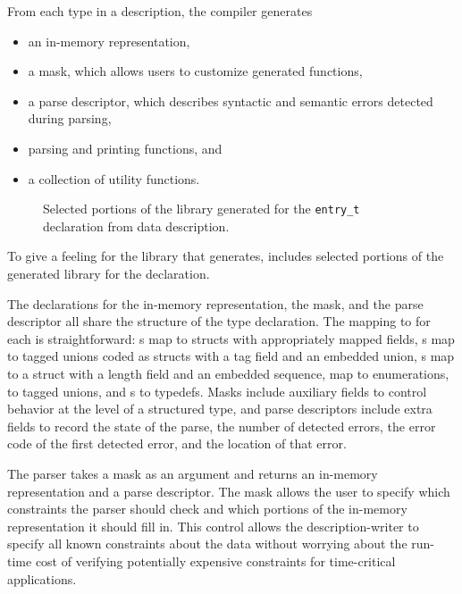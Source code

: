 From each type in a \pads{} description, the compiler generates 
\begin{itemize}
\setlength{\itemsep}{0ex plus0.2ex}
\item an in-memory representation, 
\item a mask, which allows users to customize generated functions,
\item a parse descriptor, which describes syntactic and
semantic errors detected during parsing, 
\item parsing and printing functions, and 
\item a collection of utility functions.
\end{itemize}
%
\setcounter{totalnumber}{1}
\setcounter{dbltopnumber}{1}
\renewcommand{\topfraction}{0.85}
\renewcommand{\textfraction}{0.1}
\renewcommand{\floatpagefraction}{0.75}
\begin{figure*}
\begin{tiny}

\caption{Selected portions of the library generated for the \texttt{entry\_t}
  declaration from \dibbler{} data description.}
\label{figure:library}
\end{tiny}
\end{figure*}
To give a feeling for the library that \pads{} generates, 
 includes selected portions of the generated 
library for the \dibbler{}  declaration.

The \C{} declarations for the in-memory representation, the mask, 
and the parse descriptor all share the structure of the \pads{}
type declaration.  The mapping to \C{} for each is straightforward: 
s map to \C{} structs with appropriately mapped fields, 
s map to tagged unions coded as \C{} structs with a tag field 
and an embedded 
union, s map to a \C{} struct with a length field and an 
embedded sequence,  map to \C{} enumerations,  
to tagged unions, and s to \C{} typedefs.  Masks include
auxiliary fields to control behavior at the level of a structured
type, and parse descriptors include extra fields to record the 
state of the parse, the number of detected errors, 
the error code of the first detected error, and the location of that error.

The parser takes a mask as an argument and returns an
in-memory representation and a parse descriptor.  
The mask allows the user to specify 
which constraints the parser should check and which portions of the
in-memory representation it should fill in.  This control allows the
description-writer to specify all known constraints about the data
without worrying about the run-time cost of verifying potentially
expensive constraints for time-critical applications.

